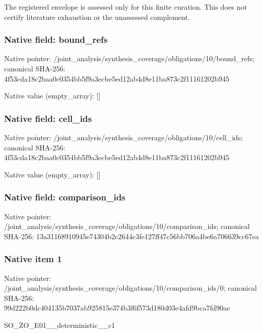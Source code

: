 \documentclass[10pt,a4paper]{article}
\begin{document}
\begingroup\raggedright\sloppy The registered envelope is assessed only for this finite curation. This does not certify literature exhaustion or the unassessed complement.\par\endgroup

\subsubsection{Native field: bound\_\allowbreak{}refs}
Native pointer: /joint\_\allowbreak{}analysis/synthesis\_\allowbreak{}coverage/obligations/10/bound\_\allowbreak{}refs; canonical SHA-256: 4f53cda18c2baa0c0354bb5f9a3ecbe5ed12ab4d8e11ba873c2f11161202b945

Native value (empty\_\allowbreak{}array): []

\subsubsection{Native field: cell\_\allowbreak{}ids}
Native pointer: /joint\_\allowbreak{}analysis/synthesis\_\allowbreak{}coverage/obligations/10/cell\_\allowbreak{}ids; canonical SHA-256: 4f53cda18c2baa0c0354bb5f9a3ecbe5ed12ab4d8e11ba873c2f11161202b945

Native value (empty\_\allowbreak{}array): []

\subsubsection{Native field: comparison\_\allowbreak{}ids}
Native pointer: /joint\_\allowbreak{}analysis/synthesis\_\allowbreak{}coverage/obligations/10/comparison\_\allowbreak{}ids; canonical SHA-256: 13a31168910945e74304b2c2644c3fe127ff47c56bb706a4be6a706639cc67ea

\subsubsection{Native item 1}
Native pointer: /joint\_\allowbreak{}analysis/synthesis\_\allowbreak{}coverage/obligations/10/comparison\_\allowbreak{}ids/0; canonical SHA-256: 99d222b0dc404135b7037ab925815e374b3f6f573d180d03e4afd9bca7fd90ae

\begingroup\raggedright\sloppy SO\_\allowbreak{}ZO\_\allowbreak{}E01\_\allowbreak{}\_\allowbreak{}deterministic\_\allowbreak{}\_\allowbreak{}c1\par\endgroup
\end{document}
